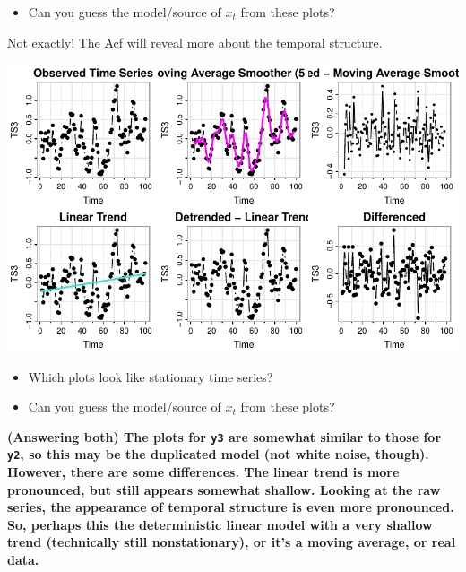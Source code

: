 \documentclass[
  letterpaper,
  DIV=11,
  numbers=noendperiod]{scrartcl}
\newenvironment{Shaded}{\begin{snugshade}}{\end{snugshade}}
\newcommand{\AttributeTok}[1]{\textcolor[rgb]{0.40,0.45,0.13}{#1}}
\newcommand{\FunctionTok}[1]{\textcolor[rgb]{0.28,0.35,0.67}{#1}}
\newcommand{\NormalTok}[1]{\textcolor[rgb]{0.00,0.23,0.31}{#1}}
\newcommand{\SpecialCharTok}[1]{\textcolor[rgb]{0.37,0.37,0.37}{#1}}
\newcommand{\StringTok}[1]{\textcolor[rgb]{0.13,0.47,0.30}{#1}}
\providecommand{\tightlist}{%
  \setlength{\itemsep}{0pt}\setlength{\parskip}{0pt}}\usepackage{longtable,booktabs,array}
\begin{document}
\begin{itemize}
\tightlist
\item
  Can you guess the model/source of \(x_t\) from these plots?
\end{itemize}

Not exactly! The Acf will reveal more about the temporal structure.

\begin{Shaded}
\end{Shaded}

\includegraphics{Lecture7_files/figure-pdf/unnamed-chunk-18-1.pdf}

\begin{itemize}
\tightlist
\item
  Which plots look like stationary time series?
\item
  Can you guess the model/source of \(x_t\) from these plots?
\end{itemize}

\textbf{(Answering both) The plots for \texttt{y3} are somewhat similar
to those for \texttt{y2}, so this may be the duplicated model (not white
noise, though). However, there are some differences. The linear trend is
more pronounced, but still appears somewhat shallow. Looking at the raw
series, the appearance of temporal structure is even more pronounced.
So, perhaps this the deterministic linear model with a very shallow
trend (technically still nonstationary), or it's a moving average, or
real data.}
\end{document}
